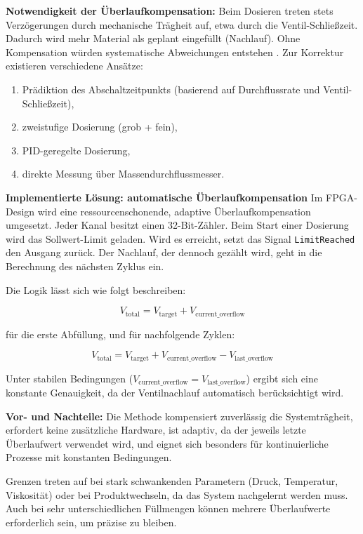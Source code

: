 \textbf{Notwendigkeit der Überlaufkompensation:}  
Beim Dosieren treten stets Verzögerungen durch mechanische Trägheit auf, etwa durch die Ventil-Schließzeit. Dadurch wird mehr Material als geplant eingefüllt (Nachlauf). Ohne Kompensation würden systematische Abweichungen entstehen \cite{jumo_regelungstechnik}.  
Zur Korrektur existieren verschiedene Ansätze:
\begin{enumerate}
    \item Prädiktion des Abschaltzeitpunkts (basierend auf Durchflussrate und Ventil-Schließzeit),
    \item zweistufige Dosierung (grob + fein),
    \item PID-geregelte Dosierung,
    \item direkte Messung über Massendurchflussmesser.
\end{enumerate}

\textbf{Implementierte Lösung: automatische Überlaufkompensation}  
Im FPGA-Design wird eine ressourcenschonende, adaptive Überlaufkompensation umgesetzt. Jeder Kanal besitzt einen 32-Bit-Zähler.  
Beim Start einer Dosierung wird das Sollwert-Limit geladen.  
Wird es erreicht, setzt das Signal \texttt{LimitReached} den Ausgang zurück.  
Der Nachlauf, der dennoch gezählt wird, geht in die Berechnung des nächsten Zyklus ein.  

Die Logik lässt sich wie folgt beschreiben:

\[
V_\text{total} = V_\text{target} + V_\text{current\_overflow}
\]

für die erste Abfüllung, und für nachfolgende Zyklen:

\[
V_\text{total} = V_\text{target} + V_\text{current\_overflow} - V_\text{last\_overflow}
\]

Unter stabilen Bedingungen (\(V_\text{current\_overflow} = V_\text{last\_overflow}\)) ergibt sich eine konstante Genauigkeit, da der Ventilnachlauf automatisch berücksichtigt wird.

\textbf{Vor- und Nachteile:}  
Die Methode kompensiert zuverlässig die Systemträgheit,  
erfordert keine zusätzliche Hardware,  
ist adaptiv, da der jeweils letzte Überlaufwert verwendet wird,  
und eignet sich besonders für kontinuierliche Prozesse mit konstanten Bedingungen.  

Grenzen treten auf bei stark schwankenden Parametern (Druck, Temperatur, Viskosität) oder bei Produktwechseln, da das System nachgelernt werden muss. Auch bei sehr unterschiedlichen Füllmengen können mehrere Überlaufwerte erforderlich sein, um präzise zu bleiben.  

